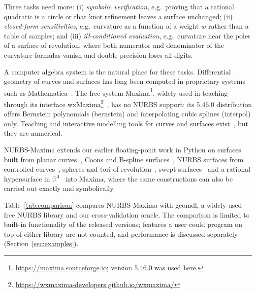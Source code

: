 \documentclass[preprint,12pt]{elsarticle}
\newcommand{\pkg}{NURBS-Maxima}
\newcommand{\code}[1]{{\ttfamily\def\_{\textunderscore\allowbreak}#1}}
\begin{document}
Three tasks need more: (i) \emph{symbolic verification}, e.g.\ proving that a rational quadratic is a circle or that knot refinement leaves a surface unchanged; (ii) \emph{closed-form sensitivities}, e.g.\ curvature as a function of a weight $w$ rather than a table of samples; and (iii) \emph{ill-conditioned evaluation}, e.g.\ curvature near the poles of a surface of revolution, where both numerator and denominator of the curvature formulas vanish and double precision loses all digits.

A computer algebra system is the natural place for these tasks. Differential geometry of curves and surfaces has long been computed in proprietary systems such as Mathematica~\cite{Cordero1995}. The free system Maxima\footnote{\url{https://maxima.sourceforge.io}; version 5.46.0 was used here.}, widely used in teaching through its interface wxMaxima\footnote{\url{https://wxmaxima-developers.github.io/wxmaxima/}}~\cite{Karjanto2021}, has no NURBS support: its 5.46.0 distribution offers Bernstein polynomials (\code{bernstein}) and interpolating cubic splines (\code{interpol}) only. Teaching and interactive modelling tools for curves and surfaces exist~\cite{Miller2010,Peixoto2024}, but they are numerical.

\pkg{} extends our earlier floating-point work in Python on surfaces built from planar curves~\cite{Urbina2025LACCEI}, Coons and B-spline surfaces~\cite{Castillo2025Coons}, NURBS surfaces from controlled curves~\cite{Urbina2025ICCSA}, spheres and tori of revolution~\cite{Castillo2026ARTIIS}, swept surfaces~\cite{Santamaria2026LACCEI} and a rational hypersurface in $\mathbb{R}^4$~\cite{Vilcamiche2025Viviani,Jing2012} into Maxima, where the same constructions can also be carried out exactly and symbolically.

Table~\ref{tab:comparison} compares \pkg{} with geomdl, a widely used free NURBS library and our cross-validation oracle. The comparison is limited to built-in functionality of the released versions; features a user could program on top of either library are not counted, and performance is discussed separately (Section~\ref{sec:examples}).
\end{document}
